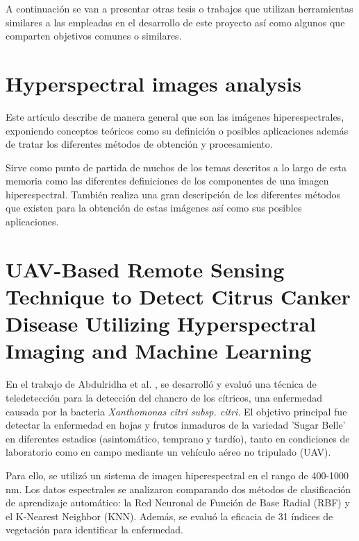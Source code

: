
A continuación se van a presentar otras tesis o trabajos que utilizan herramientas similares a las empleadas en el desarrollo de este proyecto así como algunos que comparten objetivos comunes o similares.

\section{Hyperspectral images analysis}

Este artículo describe \cite{romangonzalez:hal-00935014} de manera general que son las imágenes hiperespectrales, exponiendo conceptos teóricos como su definición o posibles aplicaciones además de tratar los diferentes métodos de obtención y procesamiento.

Sirve como punto de partida de muchos de los temas descritos a lo largo de esta memoria como las diferentes definiciones de los componentes de una imagen hiperespectral. También realiza una gran descripción de los diferentes métodos que existen para la obtención de estas imágenes así como sus posibles aplicaciones.



\section{UAV-Based Remote Sensing Technique to Detect Citrus Canker Disease Utilizing Hyperspectral Imaging and Machine Learning}

En el trabajo de Abdulridha et al. \cite{rs11111373}, se desarrolló y evaluó una técnica de teledetección para la detección del chancro de los cítricos, una enfermedad causada por la bacteria \textit{Xanthomonas citri subsp. citri}. El objetivo principal fue detectar la enfermedad en hojas y frutos inmaduros de la variedad 'Sugar Belle' en diferentes estadios (asintomático, temprano y tardío), tanto en condiciones de laboratorio como en campo mediante un vehículo aéreo no tripulado (UAV).

Para ello, se utilizó un sistema de imagen hiperespectral en el rango de 400-1000 nm. Los datos espectrales se analizaron comparando dos métodos de clasificación de aprendizaje automático: la Red Neuronal de Función de Base Radial (RBF) y el K-Nearest Neighbor (KNN). Además, se evaluó la eficacia de 31 índices de vegetación para identificar la enfermedad.


